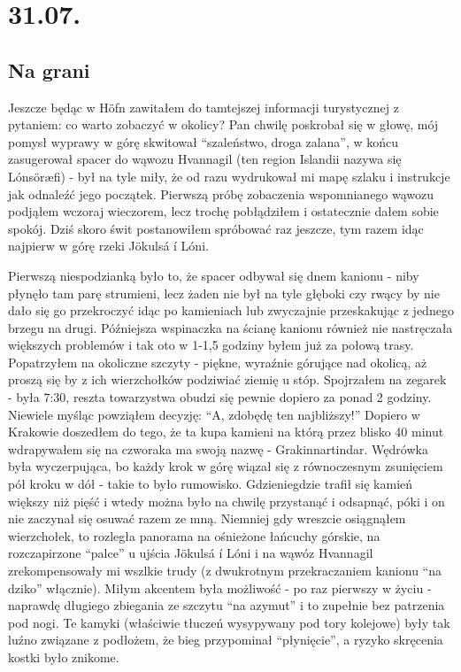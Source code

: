 \chapter{31.07.}

\section{Na grani}

Jeszcze będąc w Höfn zawitałem do tamtejszej informacji turystycznej z pytaniem: co warto zobaczyć w okolicy? Pan chwilę poskrobał się w głowę, mój pomysł wyprawy w górę  skwitował “szaleństwo, droga zalana”, w końcu zasugerował spacer do wąwozu Hvannagil (ten region Islandii nazywa się Lónsöræfi) - był na tyle miły, że od razu wydrukował mi mapę szlaku i instrukcje jak odnaleźć jego początek. Pierwszą próbę zobaczenia wspomnianego wąwozu podjąłem wczoraj wieczorem, lecz trochę pobłądziłem i ostatecznie dałem sobie spokój. Dziś skoro świt postanowiłem spróbować raz jeszcze, tym razem idąc najpierw w górę rzeki Jökulsá í Lóni.

Pierwszą niespodzianką było to, że spacer odbywał się dnem kanionu - niby płynęło tam parę strumieni, lecz żaden nie był na tyle głęboki czy rwący by nie dało się go przekroczyć idąc po kamieniach lub zwyczajnie przeskakując z jednego brzegu na drugi. Późniejsza wspinaczka na ścianę kanionu również nie nastręczała większych problemów i tak oto w 1-1,5 godziny byłem już za połową trasy. Popatrzyłem na okoliczne szczyty - piękne, wyraźnie górujące nad okolicą, aż proszą się by z ich wierzchołków podziwiać ziemię u stóp. Spojrzałem na zegarek - była 7:30, reszta towarzystwa obudzi się pewnie dopiero za ponad 2 godziny. Niewiele myśląc powziąłem decyzję: “A, zdobędę ten najbliższy!” Dopiero w Krakowie doszedłem do tego, że ta kupa kamieni na którą przez blisko 40 minut wdrapywałem się na czworaka ma swoją nazwę - Grakinnartindar. Wędrówka była wyczerpująca, bo każdy krok w górę wiązał się z równoczesnym zsunięciem pół kroku w dół - takie to było rumowisko. Gdzieniegdzie trafił się kamień większy niż pięść i wtedy można było na chwilę przystanąć i odsapnąć, póki i on nie zaczynał się osuwać razem ze mną. Niemniej gdy wreszcie osiągnąłem wierzchołek, to rozległa panorama na ośnieżone łańcuchy górskie, na rozczapirzone “palce” u ujścia Jökulsá í Lóni i na wąwóz Hvannagil zrekompensowały mi wszlkie trudy (z dwukrotnym przekraczaniem kanionu “na dziko” włącznie). Miłym akcentem była możliwość - po raz pierwszy w życiu - naprawdę długiego zbiegania ze szczytu “na azymut” i to zupełnie bez patrzenia pod nogi. Te kamyki (właściwie tłuczeń wysypywany pod tory kolejowe) były tak luźno związane z podłożem, że bieg przypominał “płynięcie”, a ryzyko skręcenia kostki było znikome.


